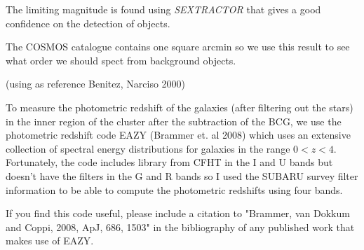 The limiting magnitude is found using \textit{SEXTRACTOR} that gives a good confidence on the detection of objects.

The COSMOS catalogue contains one square arcmin so we use this result to see what order  we should spect from background objects.

(using as reference Benitez, Narciso 2000)

To measure the photometric redshift of the galaxies (after filtering out the stars) in the inner region of the cluster after the subtraction of the BCG, we use the photometric redshift code EAZY (Brammer et. al 2008) which uses an extensive collection of spectral energy distributions for galaxies in the range $0<z<4$. Fortunately, the code includes library from CFHT in the I and U bands but doesn't have the filters in the G and R bands so I used the SUBARU survey filter information to be able to compute the photometric redshifts using four bands.

If you find this code useful, please include a citation to "Brammer, van Dokkum and Coppi, 2008, ApJ, 686, 1503" in the bibliography of any published work that makes use of EAZY.
